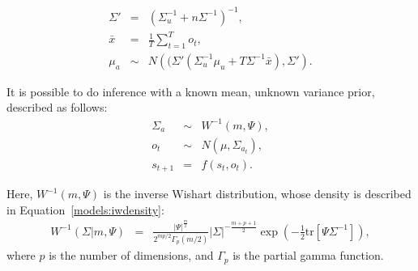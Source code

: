 \begin{eqnarray}
\Sigma' &=& \left(\Sigma_u^{-1}+n\Sigma^{-1}\right)^{-1},\\
\bar x &=& \frac 1 T \sum_{t=1}^T o_t,\\
\mu_a &\sim& N\left((\Sigma'\left(\Sigma_u^{-1}\mu_u+T\Sigma^{-1}\bar x\right), \Sigma'\right).
\end{eqnarray}

It is possible to do inference with a known mean, unknown variance prior, described as follows:
\begin{eqnarray}
\Sigma_a &\sim& W^{-1}(m, \Psi),\\
o_t &\sim& N(\mu, \Sigma_{a_t}),\\
s_{t+1} &=& f(s_t, o_t).
\end{eqnarray}

Here, $W^{-1}(m, \Psi)$ is the inverse Wishart distribution, whose density is described in Equation~\ref{models:iwdensity}:
\begin{eqnarray}
\label{models:iwdensity}W^{-1}(\Sigma|m,\Psi)&=&\frac{|\Psi|^{\frac{m}{2}}}{2^{mp/2}\Gamma_p(m/2)}|\Sigma|^{-\frac{m+p+1}{2}}\exp\left(- \frac 1 2 \mbox{tr}\left[\Psi\Sigma^{-1}\right]\right),
\end{eqnarray}
where $p$ is the number of dimensions, and $\Gamma_p$ is the partial gamma function.

